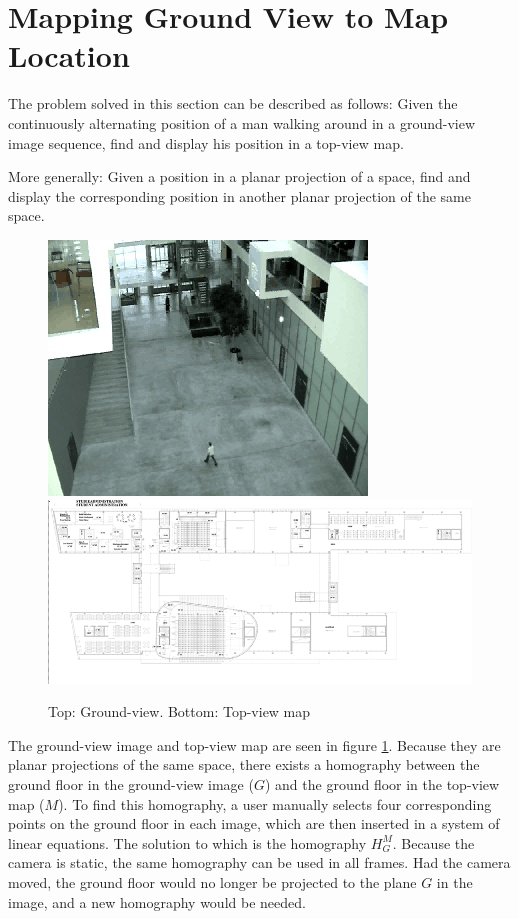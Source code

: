 \section{Mapping Ground View to Map Location}
The problem solved in this section can be described as follows:
\newline
Given the continuously alternating position of a man walking around in a
ground-view image sequence, find and display his position in a top-view map.

More generally:
\newline
Given a position in a planar projection of a space, find and display the
corresponding position in another planar projection of the same space.

\begin{figure}[ht]
\includegraphics{./pics/Ground.jpg}
\includegraphics{./pics/ITUMap.png}
\caption{Top: Ground-view. Bottom: Top-view map}
\label{fig:groundvsmap}
\end{figure}

The ground-view image and top-view map are seen in figure
\ref{fig:groundvsmap}. Because they are planar projections of the same space, there
exists a homography between the ground floor in the ground-view image ($G$) and the ground floor in the top-view map ($M$). To find this
homography, a user manually selects four corresponding points on the ground
floor in each image, which are then inserted in a system of linear equations. The solution
to which is the homography $H_{G}^{M}$.
Because the camera is static, the same homography can be used in all frames.
Had the camera moved, the ground floor would no longer be projected to the
plane $G$ in the image, and a new homography would be needed.

